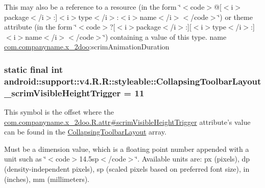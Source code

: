 This may also be a reference to a resource (in the form \char`\"{}$<$code$>$@\mbox{[}$<$i$>$package$<$/i$>$:\mbox{]}$<$i$>$type$<$/i$>$:$<$i$>$name$<$/i$>$$<$/code$>$\char`\"{}) or theme attribute (in the form \char`\"{}$<$code$>$?\mbox{[}$<$i$>$package$<$/i$>$:\mbox{]}\mbox{[}$<$i$>$type$<$/i$>$:\mbox{]}$<$i$>$name$<$/i$>$$<$/code$>$\char`\"{}) containing a value of this type.  name \hyperlink{namespacecom_1_1companyname_1_1x__2doo}{com.companyname.x\_\-2doo}:scrimAnimationDuration \hypertarget{classandroid_1_1support_1_1v4_1_1_r_1_1styleable_ef297f6084b2419ca1056fa3c53bc36f}{
\subsubsection[{CollapsingToolbarLayout\_\-scrimVisibleHeightTrigger}]{\setlength{\rightskip}{0pt plus 5cm}static final int android::support::v4.R.R::styleable::CollapsingToolbarLayout\_\-scrimVisibleHeightTrigger = 11}}
\label{classandroid_1_1support_1_1v4_1_1_r_1_1styleable_ef297f6084b2419ca1056fa3c53bc36f}


This symbol is the offset where the \hyperlink{classcom_1_1companyname_1_1x__2doo_1_1_r_1_1attr_e30bed9d129005bc4a7490f97568b438}{com.companyname.x\_\-2doo.R.attr\#scrimVisibleHeightTrigger} attribute's value can be found in the \hyperlink{classandroid_1_1support_1_1v4_1_1_r_1_1styleable_aa101903fcf4b45a3b7fee0a0abc5ea8}{CollapsingToolbarLayout} array.

Must be a dimension value, which is a floating point number appended with a unit such as \char`\"{}$<$code$>$14.5sp$<$/code$>$\char`\"{}. Available units are: px (pixels), dp (density-independent pixels), sp (scaled pixels based on preferred font size), in (inches), mm (millimeters). 

